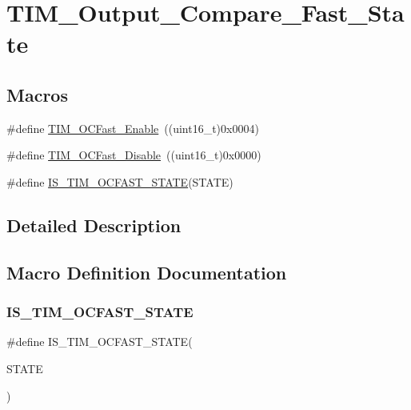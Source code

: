 \hypertarget{group___t_i_m___output___compare___fast___state}{}\section{T\+I\+M\+\_\+\+Output\+\_\+\+Compare\+\_\+\+Fast\+\_\+\+State}
\label{group___t_i_m___output___compare___fast___state}
\subsection*{Macros}
\begin{DoxyCompactItemize}
\item 
\#define \mbox{\hyperlink{group___t_i_m___output___compare___fast___state_ga0cfb598c985363ee7004e52c97c524a3}{T\+I\+M\+\_\+\+O\+C\+Fast\+\_\+\+Enable}}~((uint16\+\_\+t)0x0004)
\item 
\#define \mbox{\hyperlink{group___t_i_m___output___compare___fast___state_gab3d39f8797953cb58754205169d8278e}{T\+I\+M\+\_\+\+O\+C\+Fast\+\_\+\+Disable}}~((uint16\+\_\+t)0x0000)
\item 
\#define \mbox{\hyperlink{group___t_i_m___output___compare___fast___state_ga65ad85cb4ba48660e8f519a1f6c298d2}{I\+S\+\_\+\+T\+I\+M\+\_\+\+O\+C\+F\+A\+S\+T\+\_\+\+S\+T\+A\+TE}}(S\+T\+A\+TE)
\end{DoxyCompactItemize}


\subsection{Detailed Description}


\subsection{Macro Definition Documentation}
\mbox{\label{group___t_i_m___output___compare___fast___state_ga65ad85cb4ba48660e8f519a1f6c298d2}} 
\subsubsection{\texorpdfstring{IS\_TIM\_OCFAST\_STATE}{IS\_TIM\_OCFAST\_STATE}}
{\footnotesize\ttfamily \#define I\+S\+\_\+\+T\+I\+M\+\_\+\+O\+C\+F\+A\+S\+T\+\_\+\+S\+T\+A\+TE(\begin{DoxyParamCaption}\item[{}]{S\+T\+A\+TE }\end{DoxyParamCaption})}

